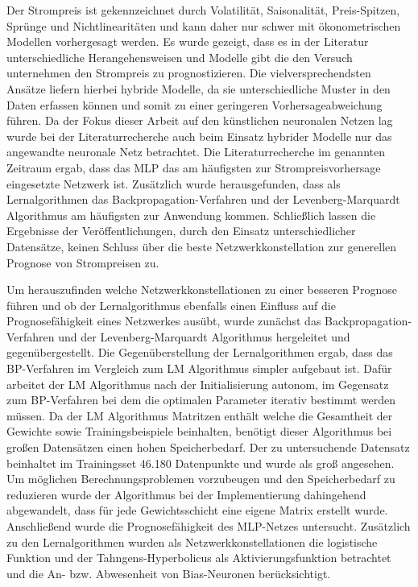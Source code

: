 Der Strompreis ist gekennzeichnet durch Volatilität, Saisonalität, Preis-Spitzen, Sprünge und Nichtlinearitäten und kann daher nur schwer mit ökonometrischen Modellen vorhergesagt werden. Es wurde gezeigt, dass es in der Literatur unterschiedliche Herangehensweisen und Modelle gibt die den Versuch unternehmen den Strompreis zu prognostizieren. Die vielversprechendsten Ansätze liefern hierbei hybride Modelle, da sie unterschiedliche Muster in den Daten erfassen können und somit zu einer geringeren Vorhersageabweichung führen. Da der Fokus dieser Arbeit auf den künstlichen neuronalen Netzen lag wurde bei der Literaturrecherche auch beim Einsatz hybrider Modelle nur das angewandte neuronale Netz betrachtet. Die Literaturrecherche im genannten Zeitraum ergab, dass das MLP das am häufigsten zur Strompreisvorhersage eingesetzte Netzwerk ist. Zusätzlich wurde herausgefunden, dass als Lernalgorithmen das Backpropagation-Verfahren und der Levenberg-Marquardt Algorithmus am häufigsten zur Anwendung kommen. Schließlich lassen die Ergebnisse der Veröffentlichungen, durch den Einsatz unterschiedlicher Datensätze, keinen Schluss über die beste Netzwerkkonstellation zur generellen Prognose von Strompreisen zu.

Um herauszufinden welche Netzwerkkonstellationen zu einer besseren Prognose führen und ob der Lernalgorithmus ebenfalls einen Einfluss auf die Prognosefähigkeit eines Netzwerkes ausübt, wurde zunächst das Backpropagation-Verfahren und der Levenberg-Marquardt Algorithmus hergeleitet und gegenübergestellt. Die Gegenüberstellung der Lernalgorithmen ergab, dass das BP-Verfahren im Vergleich zum LM Algorithmus simpler aufgebaut ist. Dafür arbeitet der LM Algorithmus nach der Initialisierung autonom, im Gegensatz zum BP-Verfahren bei dem die optimalen Parameter iterativ bestimmt werden müssen. Da der LM Algorithmus Matritzen enthält welche die Gesamtheit der Gewichte sowie Trainingsbeispiele beinhalten, benötigt dieser Algorithmus bei großen Datensätzen einen hohen Speicherbedarf. Der zu untersuchende Datensatz beinhaltet im Trainingsset 46.180 Datenpunkte und wurde als groß angesehen. Um möglichen Berechnungsproblemen vorzubeugen und den Speicherbedarf zu reduzieren wurde der Algorithmus bei der Implementierung dahingehend abgewandelt, dass für jede Gewichtsschicht eine eigene Matrix erstellt wurde.\\  

Anschließend wurde die Prognosefähigkeit des MLP-Netzes untersucht. Zusätzlich zu den Lernalgorithmen wurden als Netzwerkkonstellationen die logistische Funktion und der Tahngens-Hyperbolicus als Aktivierungsfunktion betrachtet und die An- bzw. Abwesenheit von Bias-Neuronen berücksichtigt. 


